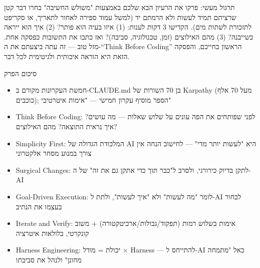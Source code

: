 \begin{tcbpractice}{תרגול מעשי: פרקו את הרעיון הבא שלכם באמצעות "משולש החשיבה"}
בחרו דבר קטן שרציתם תמיד לעשות ולא הרמתם יד (למשל עמוד ספירה לאחור לתאריך, או סקריפט לתזכורת לשתות מים). הקדישו 3 דקות לענות: (1) איזו בעיה הוא פותר? (2) איך הוא ייראה כשייבנה? (3) מהם האילוצים (זמן, טכנולוגיה, סביבה)? ואז כתבו את התשובות כפסקה אחת. מזל טוב — זה עתה ביצעתם את ה-“Think Before Coding” הראשון בחייכם, והפסקה הזאת היא הוראה איכותית ולגיטימית לכל דבר.

\end{tcbpractice}

\begin{tcbsummary}{סיכום הפרק}
\begin{itemize}
  \item חמשת העקרונות מקורם ב-CLAUDE.md בן 70 השורות של Karpathy (מעל 70 אלף כוכבים); הספר מוסיף עקרון חמישי — "אימות איטרטיבי"
  \item Think Before Coding: לפני שפותחים את הפה עונים על שלוש שאלות — מה עושים? איך נראית התוצאה? מהם האילוצים?
  \item Simplicity First: המלכודת הגדולה של AI היא "לעשות יותר מדי" — לחישוב הנחה אין צורך במנוע מסחר אלקטרוני
  \item Surgical Changes: לתקן בדיוק כירורגי, ולסרב ל"כבר תוך כדי אתקן גם את זה" של ה-AI
  \item Goal-Driven Execution: לומר "מה לעשות" ולא "איך לעשות", ולתת ל-AI לבחור בעצמו את הנתיב
  \item Iterate and Verify: אימות בשלוש רמות (תפקוד/גבולות/ארכיטקטורה) + משוב קונקרטי, בלולאות איטרציה
  \item Harness Engineering: יכולת = מודל × Harness — להתייחס ל-AI כאל "מתמחה מחונן" ולנהל את סביבתו
\end{itemize}

\end{tcbsummary}
